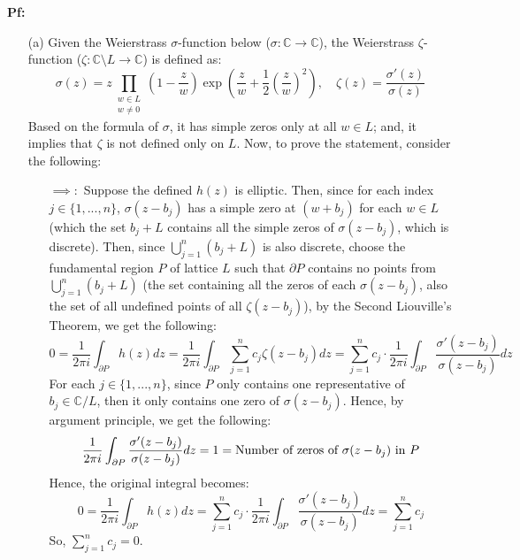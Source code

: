 \documentclass{article}
\begin{document}
\textbf{Pf:}
\begin{itemize}
    \item[(a)] Given the Weierstrass $\sigma$-function below ($\sigma:\mathbb{C}\rightarrow\mathbb{C}$), the Weierstrass $\zeta$-function ($\zeta:\mathbb{C}\setminus L\rightarrow\mathbb{C}$) is defined as:
    $$\sigma(z)=z\prod_{\substack{w\in L\\w\neq 0}}\left(1-\frac{z}{w}\right)\exp\left(\frac{z}{w}+\frac{1}{2}\left(\frac{z}{w}\right)^2\right),\quad \zeta(z)=\frac{\sigma'(z)}{\sigma(z)}$$
    Based on the formula of $\sigma$, it has simple zeros only at all $w\in L$; and, it implies that $\zeta$ is not defined only on $L$. Now, to prove the statement, consider the following:
    \begin{itemize}
        \item[$\implies:$] Suppose the defined $h(z)$ is elliptic. Then, since for each index $j\in\{1,...,n\}$, $\sigma(z-b_j)$ has a simple zero at $(w+b_j)$ for each $w\in L$ (which the set $b_j+L$ contains all the simple zeros of $\sigma(z-b_j)$, which is discrete). Then, since $\bigcup_{j=1}^{n}(b_j+L)$ is also discrete, choose the fundamental region $P$ of lattice $L$ such that $\partial P$ contains no points from $\bigcup_{j=1}^{n}(b_j+L)$ (the set containing all the zeros of each $\sigma(z-b_j)$, also the set of all undefined points of all $\zeta(z-b_j)$), by the Second Liouville's Theorem, we get the following:
        $$0=\frac{1}{2\pi i}\int_{\partial P}h(z)dz = \frac{1}{2\pi i}\int_{\partial P}\sum_{j=1}^{n}c_j\zeta(z-b_j)dz = \sum_{j=1}^{n}c_j\cdot\frac{1}{2\pi i}\int_{\partial P}\frac{\sigma'(z-b_j)}{\sigma(z-b_j)}dz$$
        For each $j\in\{1,...,n\}$, since $P$ only contains one representative of $b_j\in\mathbb{C}/L$, then it only contains one zero of $\sigma(z-b_j)$. Hence, by argument principle, we get the following:
        $$\frac{1}{2\pi i}\int_{\partial P}\frac{\sigma'(z-b_j)}{\sigma(z-b_j)}dz = 1 = \textmd{Number of zeros of } \sigma(z-b_j) \textmd{ in } P$$
        Hence, the original integral becomes:
        $$0=\frac{1}{2\pi i}\int_{\partial P}h(z)dz = \sum_{j=1}^{n}c_j\cdot\frac{1}{2\pi i}\int_{\partial P}\frac{\sigma'(z-b_j)}{\sigma(z-b_j)}dz = \sum_{j=1}^{n}c_j$$
        So, $\sum_{j=1}^{n}c_j = 0$.

        \hfil


\end{itemize}
\end{itemize}
\end{document}
